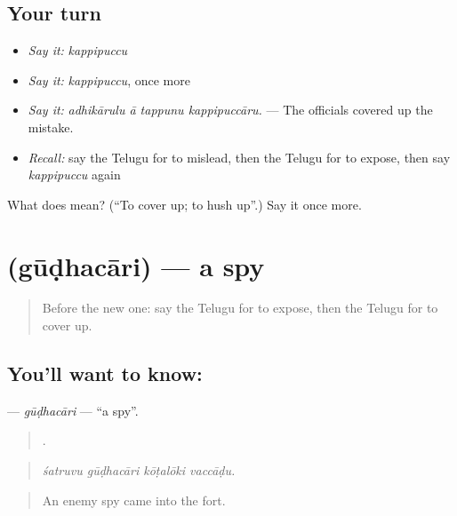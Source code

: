 \subsection*{Your turn}
\begin{itemize}
\raggedright
  \item \emph{Say it:} \emph{kappipuccu}
  \item \emph{Say it:} \emph{kappipuccu}, once more
  \item \emph{Say it:} \emph{adhikārulu ā tappunu kappipuccāru.} — The officials covered up the mistake.
  \item \emph{Recall:} say the Telugu for to mislead, then the Telugu for to expose, then say \emph{kappipuccu} again
\end{itemize}

\begin{tcolorbox}[breakable,colback=teal!4,colframe=teal!35!black,title={Before you move on}]
What does  mean? (\textquotedblleft{}To cover up; to hush up\textquotedblright{}.) Say it once more.
\end{tcolorbox}
\section[\texorpdfstring{\te{గూఢచారి} (gūḍhacāri)}{గూఢచారి (gūḍhacāri)}]{ (gūḍhacāri) — a spy}

\label{lesson:TE-C354-gudhacari}



\begin{quote}
Before the new one: say the Telugu for to expose, then the Telugu for to cover up.
\end{quote}

\subsection*{You'll want to know: }
\textbf{} — \emph{gūḍhacāri} — \textquotedblleft{}a spy\textquotedblright{}.

\begin{quote}
   .
\end{quote}

\begin{quote}
\emph{śatruvu gūḍhacāri kōṭalōki vaccāḍu.}
\end{quote}

\begin{quote}
An enemy spy came into the fort.
\end{quote}

